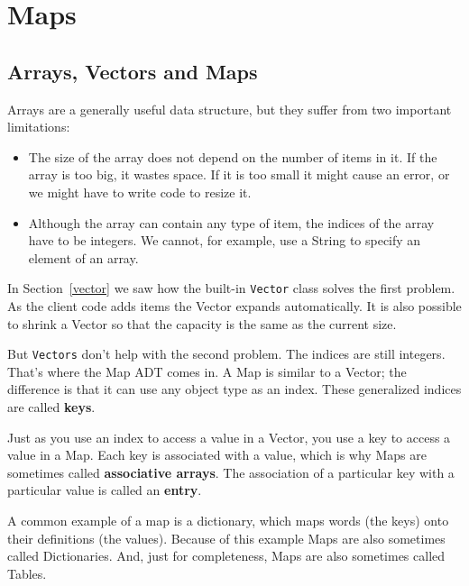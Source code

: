 \documentclass[12pt]{book}
\theoremstyle{exercise}
\begin{document}
\chapter{Maps}

\section {Arrays, Vectors and Maps}

Arrays are a generally useful data structure, but they suffer
from two important limitations:

\begin{itemize}

\item The size of the array does not depend on the number of
items in it.  If the array is too big, it wastes space.  If
it is too small it might cause an error, or we might have to
write code to resize it.

\item Although the array can contain any type of item, the
indices of the array have to be integers.  We cannot, for
example, use a String to specify an element of an array.

\end{itemize}

In Section~\ref{vector} we saw how the built-in {\tt Vector} class
solves the first problem.  As the client code adds items the Vector
expands automatically.  It is also possible to shrink a Vector so that
the capacity is the same as the current size.

But {\tt Vectors} don't help with the second problem.  The indices are
still integers.  That's where the Map ADT comes in.  A Map is similar
to a Vector; the difference is that it can use any object type as an
index.  These generalized indices are called {\bf keys}.

Just as you use an index to access a value in a Vector, you use a key
to access a value in a Map.  Each key is associated with a value,
which is why Maps are sometimes called {\bf associative arrays}.  The
association of a particular key with a particular value is called an
{\bf entry}.


A common example of a map is a dictionary, which maps
words (the keys) onto their definitions (the
values).  Because of this example Maps are also sometimes called
Dictionaries.  And, just for completeness, Maps are also sometimes
called Tables.
\end{document}
